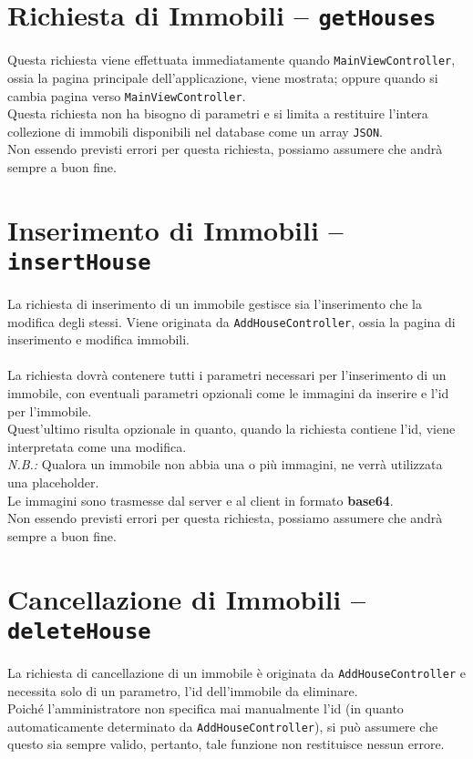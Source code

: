 \section{Richiesta di Immobili – \texttt{getHouses}}
\noindent Questa richiesta viene effettuata immediatamente quando \texttt{MainViewController}, ossia la pagina principale dell’applicazione, viene mostrata; oppure quando si cambia pagina verso \texttt{MainViewController}.\\
Questa richiesta non ha bisogno di parametri e si limita a restituire l’intera collezione di immobili disponibili nel database come un array \texttt{JSON}.\\
Non essendo previsti errori per questa richiesta, possiamo assumere che andrà sempre a buon fine.

\section{Inserimento di Immobili – \texttt{insertHouse}}
\noindent La richiesta di inserimento di un immobile gestisce sia l’inserimento che la modifica degli stessi. Viene originata da \texttt{AddHouseController}, ossia la pagina di inserimento e modifica immobili.\\
\\
La richiesta dovrà contenere tutti i parametri necessari per l’inserimento di un immobile, con eventuali parametri opzionali come le immagini da inserire e l’id per l’immobile.\\
Quest'ultimo risulta opzionale in quanto, quando la richiesta contiene l’id, viene interpretata come una modifica.\\
\textit{N.B.:} Qualora un immobile non abbia una o più immagini, ne verrà utilizzata una placeholder.\\
Le immagini sono trasmesse dal server e al client in formato \textbf{base64}.\\
Non essendo previsti errori per questa richiesta, possiamo assumere che andrà sempre a buon fine.

\section{Cancellazione di Immobili – \texttt{deleteHouse}}
\noindent La richiesta di cancellazione di un immobile è originata da \texttt{AddHouseController} e necessita solo di un parametro, l’id dell’immobile da eliminare.\\
Poiché l’amministratore non specifica mai manualmente l’id (in quanto automaticamente determinato da \texttt{AddHouseController}), si può assumere che questo sia sempre valido, pertanto, tale funzione non restituisce nessun errore.

